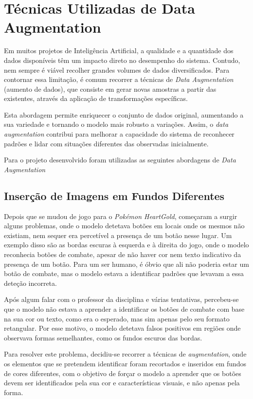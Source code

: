 \section{Técnicas Utilizadas de Data Augmentation} \label{data_augmentation}

Em muitos projetos de Inteligência Artificial, a qualidade e a quantidade dos dados disponíveis têm um impacto direto no desempenho do sistema. Contudo, nem sempre é viável recolher grandes volumes de dados diversificados. Para contornar essa limitação, é comum recorrer a técnicas de \textit{Data Augmentation} (aumento de dados), que consiste em gerar novas amostras a partir das existentes, através da aplicação de transformações específicas.

Esta abordagem permite enriquecer o conjunto de dados original, aumentando a sua variedade e tornando o modelo mais robusto a variações. Assim, o \textit{data augmentation} contribui para melhorar a capacidade do sistema de reconhecer padrões e lidar com situações diferentes das observadas inicialmente.

Para o projeto desenvolvido foram utilizadas as seguintes abordagens de \textit{Data Augmentation}

\subsection{Inserção de Imagens em Fundos Diferentes}

Depois que se mudou de jogo para o \textit{Pokémon HeartGold}, começaram a surgir alguns problemas, onde o modelo detetava botões em locais onde os mesmos não existiam, nem sequer era percetível a presença de um botão nesse lugar. Um exemplo disso são as bordas escuras à esquerda e à direita do jogo, onde o modelo reconhecia botões de combate, apesar de não haver cor nem texto indicativo da presença de um botão. Para um ser humano, é óbvio que ali não poderia estar um botão de combate, mas o modelo estava a identificar padrões que levavam a essa deteção incorreta.

Após algum falar com o professor da disciplina e várias tentativas, percebeu-se que o modelo não estava a aprender a identificar os botões de combate com base na sua cor ou texto, como era o esperado, mas sim apenas pelo seu formato retangular. Por esse motivo, o modelo detetava falsos positivos em regiões onde observava formas semelhantes, como os fundos escuros das bordas.

Para resolver este problema, decidiu-se recorrer a técnicas de \textit{augmentation}, onde os elementos que se pretendem identificar foram recortados e inseridos em fundos de cores diferentes, com o objetivo de forçar o modelo a aprender que os botões devem ser identificados pela sua cor e características visuais, e não apenas pela forma.

